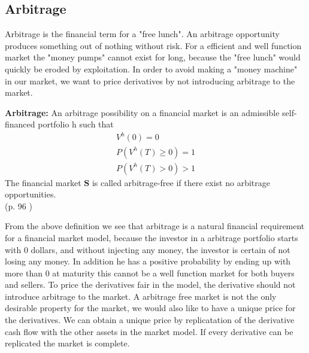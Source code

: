 \subsection{Arbitrage}
Arbitrage is the financial term for a "free lunch". An arbitrage opportunity produces something out of nothing without risk. For a efficient and well function market the "money pumps" cannot exist for long, because the "free lunch" would quickly be eroded by exploitation. In order to avoid making a "money machine" in our market, we want to price derivatives by not introducing arbitrage to the market.  
\theoremstyle{definition}
\begin{definition}{\textbf{Arbitrage: }}\label{Arbitrage}
An arbitrage possibility on a financial market is an admissible self-financed portfolio h such that
\begin{equation*}
\begin{split}
V^{h}(0)=0\\
P(V^{h}(T)\geq 0)=1\\
P(V^{h}(T)>0)>1
\end{split}
\end{equation*}
The financial market $\bm{S}$ is called arbitrage-free if there exist no arbitrage opportunities.\\
\null \hfill (p. 96 \parencite{finKont})
\end{definition}
From the above definition we see that arbitrage is a natural financial requirement for a financial market model, because the investor in a arbitrage portfolio starts with 0 dollars, and without injecting any money, the investor is certain of not losing any money. In addition he has a positive probability by ending up with more than 0 at maturity this cannot be a well function market for both buyers and sellers. To price the derivatives fair in the model, the derivative should not introduce arbitrage to the market. A arbitrage free market is not the only desirable property for the market, we would also like to have a unique price for the derivatives. We can obtain a unique price by replicatation of the derivative cash flow with the other assets in the market model. If every derivative can be replicated the market is complete. 



